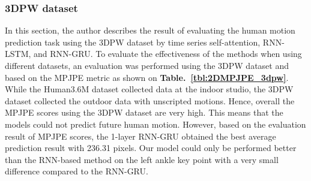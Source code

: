 \subsubsection{3DPW dataset}\label{4:2D3dpw}
In this section, the author describes the result of evaluating the human motion prediction task using the 3DPW dataset by time series self-attention, RNN-LSTM, and RNN-GRU.
To evaluate the effectiveness of the methods when using different datasets, an evaluation was performed using the 3DPW dataset and based on the MPJPE metric as shown on \textbf{Table.~\ref{tbl:2DMPJPE_3dpw}}. While the Human3.6M dataset collected data at the indoor studio, the 3DPW dataset collected the outdoor data with unscripted motions. Hence, overall the MPJPE scores using the 3DPW dataset are very high. This means that the models could not predict future human motion. However, based on the evaluation result of MPJPE scores, the 1-layer RNN-GRU obtained the best average prediction result with 236.31 pixels. Our model could only be performed better than the RNN-based method on the left ankle key point with a very small difference compared to the RNN-GRU. 

